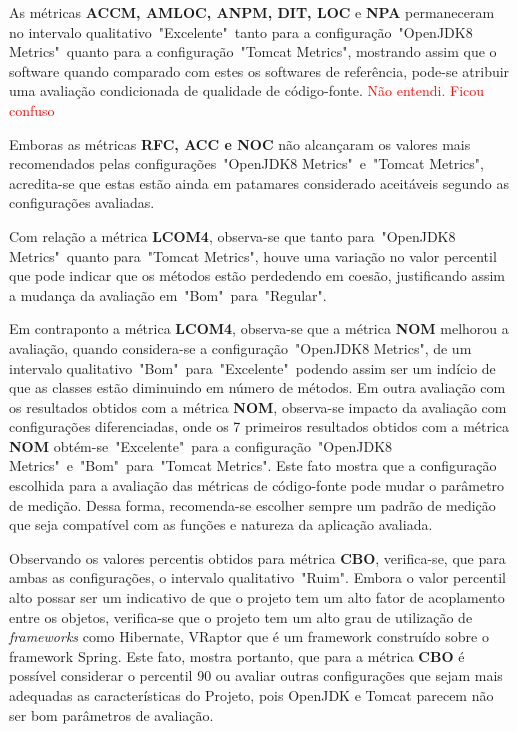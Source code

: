 As métricas \textbf{ACCM, AMLOC, ANPM, DIT, LOC} e \textbf{NPA} permaneceram no intervalo qualitativo~"Excelente"~tanto para a configuração~"OpenJDK8 Metrics"~quanto para a configuração~"Tomcat Metrics", mostrando assim que o software quando comparado com estes os softwares de referência, pode-se atribuir uma avaliação condicionada de qualidade de código-fonte. \textcolor{red}{Não entendi. Ficou confuso}

Emboras as métricas \textbf{RFC, ACC e NOC} não alcançaram os valores mais recomendados pelas configurações~"OpenJDK8 Metrics"~e~"Tomcat Metrics", acredita-se que estas estão ainda em patamares considerado aceitáveis segundo as configurações avaliadas. 

Com relação a métrica \textbf{LCOM4}, observa-se que tanto para~"OpenJDK8 Metrics"~quanto para~"Tomcat Metrics", houve uma variação no valor percentil que pode indicar que os métodos estão perdedendo em coesão, justificando assim a mudança da avaliação em~"Bom"~para~"Regular".

Em contraponto a métrica \textbf{LCOM4}, observa-se que a métrica \textbf{NOM} melhorou a avaliação, quando considera-se a configuração~"OpenJDK8 Metrics", de um intervalo qualitativo~"Bom"~para~"Excelente"~podendo assim ser um indício de que as classes estão diminuindo em número de métodos. Em outra avaliação com os resultados obtidos com a métrica \textbf{NOM}, observa-se impacto da avaliação com configurações diferenciadas, onde  os 7 primeiros resultados obtidos com a métrica \textbf{NOM} obtém-se~"Excelente"~para a configuração~"OpenJDK8 Metrics"~e~"Bom"~para~"Tomcat Metrics". Este fato mostra que a configuração escolhida para a avaliação das métricas de código-fonte pode mudar o parâmetro de medição. Dessa forma, recomenda-se escolher sempre um padrão de medição que seja compatível com as funções e natureza da aplicação avaliada.


Observando os valores percentis obtidos para métrica \textbf{CBO}, verifica-se, que para ambas as configurações, o intervalo qualitativo~"Ruim". Embora o valor percentil alto possar ser um indicativo de que o projeto tem um alto fator de acoplamento entre os objetos, verifica-se que o projeto tem um alto grau de utilização de \textit{frameworks} como Hibernate, VRaptor que é um framework construído sobre o framework Spring. Este fato, mostra portanto, que para a métrica \textbf{CBO} é possível considerar o percentil 90 ou avaliar outras configurações que sejam mais adequadas as características do Projeto, pois OpenJDK e Tomcat parecem não ser bom parâmetros de avaliação.  



